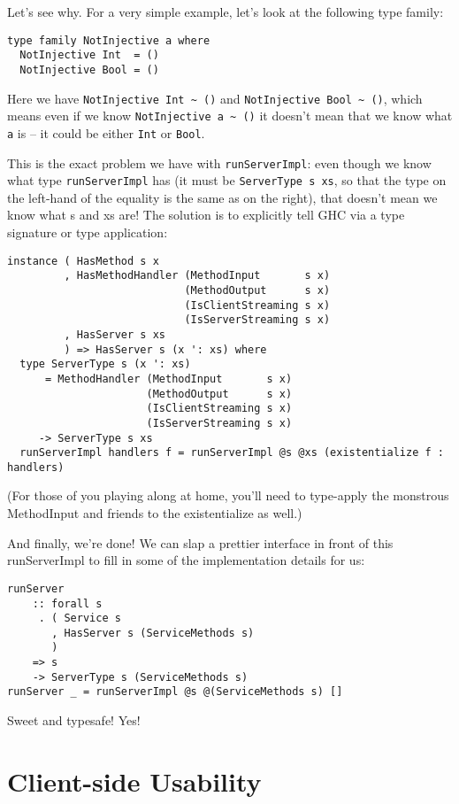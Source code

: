 {Let's see why. For a very simple example, let's look at the following type family:

\begin{verbatim}
type family NotInjective a where
  NotInjective Int  = ()
  NotInjective Bool = ()
\end{verbatim}
Here we have \texttt{NotInjective Int \~{} ()} and \texttt{NotInjective Bool \~{} ()}, which means even if we know \texttt{NotInjective a \~{} ()} it doesn't mean that we know what \texttt{a} is -- it could be either \texttt{Int} or \texttt{Bool}.

This is the exact problem we have with \texttt{runServerImpl}: even though we know what type \texttt{runServerImpl} has (it must be \texttt{ServerType s xs}, so that the type on the left-hand of the equality is the same as on the right), that doesn't mean we know what s and xs are! The solution is to explicitly tell GHC via a type signature or type application:

\begin{verbatim}
instance ( HasMethod s x
         , HasMethodHandler (MethodInput       s x)
                            (MethodOutput      s x)
                            (IsClientStreaming s x)
                            (IsServerStreaming s x)
         , HasServer s xs
         ) => HasServer s (x ': xs) where
  type ServerType s (x ': xs)
      = MethodHandler (MethodInput       s x)
                      (MethodOutput      s x)
                      (IsClientStreaming s x)
                      (IsServerStreaming s x)
     -> ServerType s xs
  runServerImpl handlers f = runServerImpl @s @xs (existentialize f : handlers)
\end{verbatim}
(For those of you playing along at home, you'll need to type-apply the monstrous MethodInput and friends to the existentialize as well.)

And finally, we're done! We can slap a prettier interface in front of this runServerImpl to fill in some of the implementation details for us:

\begin{verbatim}
runServer
    :: forall s
     . ( Service s
       , HasServer s (ServiceMethods s)
       )
    => s
    -> ServerType s (ServiceMethods s)
runServer _ = runServerImpl @s @(ServiceMethods s) []
\end{verbatim}
Sweet and typesafe! Yes!

\section{Client-side Usability}

}
